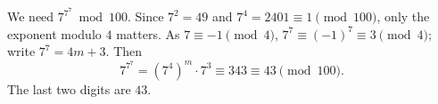 We need $7^{7^7}\bmod100$. Since $7^2=49$ and $7^4=2401\equiv1\pmod{100}$, only the exponent modulo $4$ matters. As $7\equiv-1\pmod4$, $7^7\equiv(-1)^7\equiv3\pmod4$; write $7^7=4m+3$. Then
\[7^{7^7}=(7^4)^m\cdot7^3\equiv343\equiv43\pmod{100}.\]
The last two digits are $\boxed{43}$.
